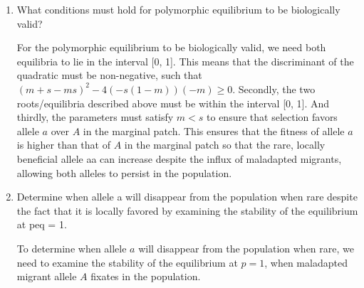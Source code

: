 \documentclass[11pt]{exam}
\begin{document}
\begin{questions}
\begin{enumerate}
  \par\begin{mysolution}
    After selection but before migration, we have
    \[
    p' = \frac{p(1-s)}{p(1-s)+(1-p)} = \frac{p(1-s)}{1-sp}
    \]
    After migration we get 
    \[
    p_{t+1} = (1-m)p' + m
    \]
    Substituting p' into the post-migration equation, we have
    \[
    p_{t+1} = (1-m) \frac{p(1-s)}{1-sp} + m
    \]
    At equilibrium, $p_{t+1} = p$, so we have
    \begin{align}
    p &= (1-m) \frac{p(1-s)}{1-sp} + m \\
    p(1-sp) &= (1-m) p(1-s) + m(1-sp) \\
    p - p^2s &= (1-m)p(1-s) + m(1-sp) \\
    p - p^2s &= (1-m)p(1-s) + m - msp \\
    p - p^2s - (1-m)p(1-s) - m + msp &= 0 \\
    p (m + s - ms) - sp^2 + msp - m &= 0 \\
    p(m + s - ms) - sp^2(1-m) - m &= 0 \\
    -sp^2 (1 - m) + p(m + s - ms) - m &= 0
    \end{align}
    This is quadratic in $p$, so using the quadratic formula the two equilibria are as follows:
    \[
    p^* = \frac{-(m + s - ms) \pm \sqrt{(m+s-ms)^{2} - 4(-s(1-m))(-m)}}{2(-s(1-m))}
    \]
  \end{mysolution}
  \item What conditions must hold for polymorphic equilibrium to be biologically valid?
  \par\begin{mysolution}
    For the polymorphic equilibrium to be biologically valid, we need both equilibria to lie in the interval [0, 1]. This means that the discriminant of the quadratic must be non-negative, such that $(m+s-ms)^{2} - 4(-s(1-m))(-m) \geq 0$. Secondly, the two roots/equilibria described above must be within the interval [0, 1]. And thirdly, the parameters must satisfy $m<s$ to ensure that selection favors allele $a$ over $A$ in the marginal patch. This ensures that the fitness of allele $a$ is higher than that of $A$ in the marginal patch so that the rare, locally beneficial allele aa can increase despite the influx of maladapted migrants, allowing both alleles to persist in the population.
  \end{mysolution}
  
  \item Determine when allele a will disappear from the population when rare despite the fact that it is locally favored by examining the stability of the equilibrium at peq = 1.
  \begin{mysolution}
    To determine when allele $a$ will disappear from the population when rare, we need to examine the stability of the equilibrium at $p = 1$, when maladapted migrant allele $A$ fixates in the population. 


\end{mysolution}
\end{enumerate}
\end{questions}
\end{document}
